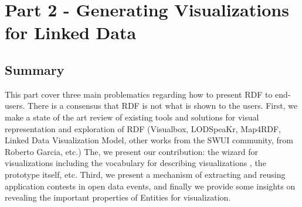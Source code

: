 \chapter*{Part 2 - Generating Visualizations for Linked Data}
\label{part:part2}
 \vspace{10mm}
\section*{Summary}
This part cover three main problematics regarding how to present RDF to end-users. There is a consensus that RDF is not what is shown to the users.  First, we make a state of the art review of existing tools and solutions for visual representation and exploration of RDF (Visualbox, LODSpeaKr, Map4RDF, Linked Data Visualization Model, other works from the SWUI community, from Roberto Garcia, etc.) The, we present our contribution: the wizard for visualizations including the vocabulary for describing visualizations , the prototype itself, etc. Third, we present a  mechanism of extracting and reusing application contests in open data events, and finally we provide some insights on revealing the important properties of Entities for visualization. 